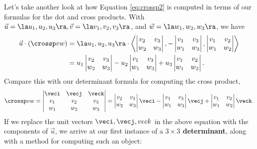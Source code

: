 Let's take another look at how Equation \eqref{eq:crossp2} is computed in terms of our formulas for the dot and cross products. With $\vec u = \la u_1, u_2, u_3\ra, \vec v = \la v_1, v_2, v_3\ra$, and $\vec w = \la w_1, w_2, w_3\ra$, we have
\begin{align*}
\vec{u}\cdot(\crossp vw) & = \la u_1, u_2, u_3\ra \cdot\left\langle \begin{vmatrix} v_2 & v_3\\w_2&w_3\end{vmatrix}, -\begin{vmatrix} v_1 & v_3\\ w_1 & w_3\end{vmatrix}, \begin{vmatrix} v_1 & v_2\\ w_1 & w_2\end{vmatrix}\right\rangle\\
 & = u_1\begin{vmatrix} v_2 & v_3\\w_2&w_3\end{vmatrix} - u_2\begin{vmatrix} v_1 & v_3\\ w_1 & w_3\end{vmatrix} + u_3\begin{vmatrix} v_1 & v_2\\ w_1 & w_2\end{vmatrix}.
\end{align*}
Compare this with our determinant formula for computing the cross product,
\[
\crossp vw = \begin{vmatrix} \veci & \vecj & \veck\\ v_1 & v_2 & v_3\\ w_1 & w_2 & w_3\end{vmatrix} = \begin{vmatrix} v_2 & v_3\\w_2&w_3\end{vmatrix}\veci - \begin{vmatrix} v_1 & v_3\\ w_1 & w_3\end{vmatrix}\vecj + \begin{vmatrix} v_1 & v_2\\ w_1 & w_2\end{vmatrix}\veck.
\]
If we replace the unit vectors $\veci, \vecj, veck$ in the above equation with the components of $\vec{u}$, we arrive at our first instance of a \textbf{$3\times 3$ determinant}, along with a method for computing such an object:
